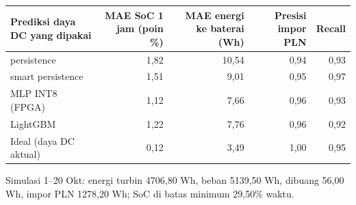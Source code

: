 \begin{center}\small
\begin{tabular}{@{}l r r r r@{}}
\toprule
Prediksi daya DC yang dipakai & MAE SoC 1 jam (poin \%) & MAE energi ke baterai (Wh) & Presisi impor PLN & Recall \\ \midrule
persistence & 1,82 & 10,54 & 0,94 & 0,93 \\
smart persistence & 1,51 & 9,01 & 0,95 & 0,97 \\
MLP INT8 (FPGA) & 1,12 & 7,66 & 0,96 & 0,93 \\
LightGBM & 1,22 & 7,76 & 0,96 & 0,92 \\
Ideal (daya DC aktual) & 0,12 & 3,49 & 1,00 & 0,95 \\
\bottomrule
\end{tabular}
\end{center}
Simulasi 1--20 Okt: energi turbin 4706,80 Wh, beban 5139,50 Wh, dibuang 56,00 Wh, impor PLN 1278,20 Wh; SoC di batas minimum 29,50\% waktu.